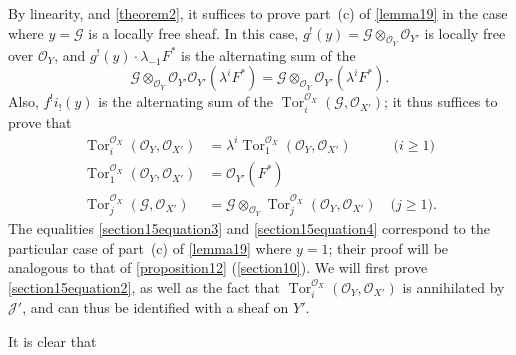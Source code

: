 \documentclass{article}
\theoremstyle{plain}
\theoremstyle{definition}
\newcommand{\sh}{\mathscr}
\renewcommand{\geq}{\geqslant}
\DeclareMathOperator{\Tor}{Tor}
\newcommand{\oldpage}[1]{\marginpar{\footnotesize$\Big\vert$ \textit{p.~#1}}}
\begin{document}
By linearity, and \cref{theorem2}, it suffices to prove part~(c) of \cref{lemma19} in the case where $y=\sh{G}$ is a locally free sheaf.
In this case, $g^!(y)=\sh{G}\otimes_{\sh{O}_Y}\sh{O}_{Y'}$ is locally free over $\sh{O}_Y$, and $g^!(y)\cdot\lambda_{-1}F^*$ is the alternating sum of the
\[
  \sh{G} \otimes_{\sh{O}_Y} \sh{O}_{Y'} \sh{O}_{Y'}(\lambda^i F^*)
  = \sh{G} \otimes_{\sh{O}_Y} \sh{O}_{Y'}(\lambda^i F^*).
\]
Also, $f^!i_!(y)$ is the alternating sum of the $\Tor_i^{\sh{O}_X}(\sh{G},\sh{O}_{X'})$;
it thus suffices to prove that
\begin{align*}
  \label{section15equation2}
    \Tor_i^{\sh{O}_X}(\sh{O}_Y,\sh{O}_{X'}) &= \lambda^i\Tor_1^{\sh{O}_X}(\sh{O}_Y,\sh{O}_{X'})
    \qquad\quad\mbox{($i\geq1$)}
    \tag{2}
\\
  \label{section15equation3}
    \Tor_1^{\sh{O}_X}(\sh{O}_Y,\sh{O}_{X'}) &= \sh{O}_{Y'}(F^*)
    \tag{3}
\\
  \label{section15equation4}
    \Tor_j^{\sh{O}_X}(\sh{G},\sh{O}_{X'}) &= \sh{G}\otimes_{\sh{O}_Y}\Tor_j^{\sh{O}_X}(\sh{O}_Y,\sh{O}_{X'})
    \quad\mbox{($j\geq1$).}
    \tag{4}
\end{align*}
\oldpage{131}
The equalities \cref{section15equation3} and \cref{section15equation4} correspond to the particular case of part~(c) of \cref{lemma19} where $y=1$;
their proof will be analogous to that of \cref{proposition12} (\cref{section10}).
We will first prove \cref{section15equation2}, as well as the fact that $\Tor_i^{\sh{O}_X}(\sh{O}_Y,\sh{O}_{X'})$ is annihilated by $\sh{J}'$, and can thus be identified with a sheaf on $Y'$.

It is clear that



\nocite{*}

\end{document}
